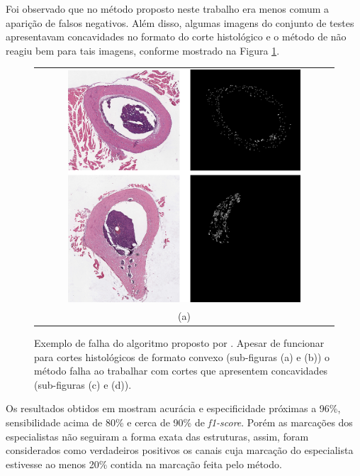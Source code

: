 Foi observado que no método proposto neste trabalho era menos comum a aparição de falsos negativos. Além disso, algumas imagens do conjunto de testes apresentavam concavidades no formato do corte histológico e o método de \cite{gondim2021automatic} não reagiu bem para tais imagens, conforme mostrado na Figura \ref{fig:gondim-bad-prediction}.

\begin{figure}[h]
    \centering
    
    \begin{tabular}{c}
        \includegraphics[width=0.8\textwidth]{figures/4_results/falha-gondim_lower_res.png} \\[\abovecaptionskip]
    \small (a) 
    \end{tabular}

    \caption[Exemplo de falha do algoritmo proposto por \cite{gondim2021automatic}.]{Exemplo de falha do algoritmo proposto por \cite{gondim2021automatic}. Apesar de funcionar para cortes histológicos de formato convexo (sub-figuras (a) e (b)) o método falha ao trabalhar com cortes que apresentem concavidades (sub-figuras (c) e (d)).}
    \label{fig:gondim-bad-prediction}
\end{figure}

Os resultados obtidos em \cite{gondim2021automatic} mostram acurácia e especificidade próximas a 96\%, sensibilidade acima de 80\% e cerca de 90\% de \textit{f1-score}. Porém as marcações dos especialistas não seguiram a forma exata das estruturas, assim, foram considerados como verdadeiros positivos os canais cuja marcação do especialista estivesse ao menos 20\% contida na marcação feita pelo método. 

